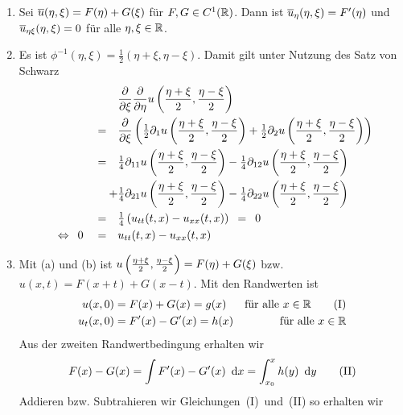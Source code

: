 \begin{exercisePage}
	\begin{enumerate}[label=(zu \alph*), leftmargin=*]
		\item Sei $\overline{u}(\eta, \xi) = F(\eta) + G(\xi)$ für $F,G \in C^1(\mathbb{R})$. Dann ist $\overline{u}_\eta(\eta, \xi) = F'(\eta)$ und $\overline{u}_{\eta \xi} (\eta, \xi) = 0$ für alle $\eta, \xi \in \mathbb{R}$.
		\item Es ist $\phi^{-1}(\eta, \xi) = \frac{1}{2}(\eta + \xi, \eta - \xi)$. Damit gilt unter Nutzung des Satz von Schwarz
		\begin{equation*}
			\begin{aligned}
				&\frac{\partial}{\partial \xi } \frac{\partial}{\partial \eta } u\left( \frac{\eta + \xi}{2}, \frac{\eta - \xi}{2} \right) \\ 
				= \quad &\frac{\partial}{\partial \xi } \left( \tfrac{1}{2} \partial_1 u\left( \frac{\eta + \xi}{2}, \frac{\eta - \xi}{2} \right) + \tfrac{1}{2} \partial_2 u\left( \frac{\eta + \xi}{2}, \frac{\eta - \xi}{2} \right) \right) \\
				= \quad & \tfrac{1}{4} \partial_{11} u\left( \frac{\eta + \xi}{2}, \frac{\eta - \xi}{2} \right) 
				- \tfrac{1}{4} \partial_{12} u\left( \frac{\eta + \xi}{2}, \frac{\eta - \xi}{2} \right)  \\
				+ &\tfrac{1}{4} \partial_{21} u\left( \frac{\eta + \xi}{2}, \frac{\eta - \xi}{2} \right) 
				- \tfrac{1}{4} \partial_{22} u\left( \frac{\eta + \xi}{2}, \frac{\eta - \xi}{2} \right) \\
				= \quad &\tfrac{1}{4} \left( u_{tt}(t,x) - u_{xx}(t,x) \right) 
				\enskip = \enskip 0 \\
				\enskip \Leftrightarrow \enskip 0 \quad = \quad &u_{tt}(t,x) - u_{xx}(t,x)
			\end{aligned}
		\end{equation*}
		\item Mit (a) und (b) ist $u\left( \frac{\eta + \xi}{2}, \frac{\eta - \xi}{2} \right) = F(\eta) + G(\xi)$ bzw. $u(x,t) = F(x+t) + G(x-t)$. Mit den Randwerten ist
		\begin{align*}
			u(x,0) &= F(x) + G(x) = g(x) & \text{für alle } x \in \mathbb{R} \tag{I} \\
			u_t(x,0) &= F'(x) - G'(x) = h(x) & \text{für alle } x \in \mathbb{R}
		\end{align*}
		Aus der zweiten Randwertbedingung erhalten wir 
		\begin{equation}
			F(x) - G(x) = \int F'(x) - G'(x) \enskip \mathrm{d}x = \int_{x_0}^x h(y) \enskip \mathrm{d}y \tag{II}
		\end{equation}
		Addieren bzw. Subtrahieren wir Gleichungen~(I)~und~(II) so erhalten wir
		\begin{equation*}

\end{equation*}
\end{enumerate}
\end{exercisePage}
